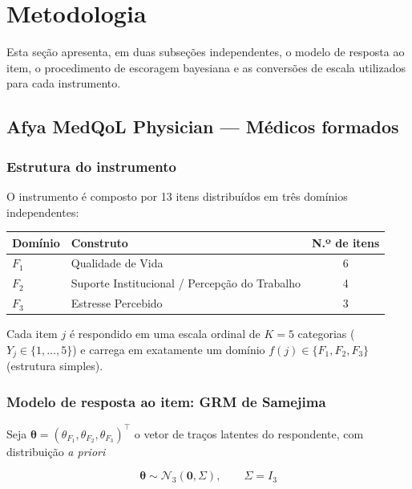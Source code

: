 \documentclass[12pt,a4paper]{article}
\begin{document}
\section{Metodologia}
\label{sec:metodologia}

Esta seção apresenta, em duas subseções independentes, o modelo de resposta
ao item, o procedimento de escoragem bayesiana e as conversões de escala
utilizados para cada instrumento.

\subsection{Afya MedQoL Physician --- Médicos formados}
\label{sec:medqol}

\subsubsection{Estrutura do instrumento}

O instrumento é composto por 13 itens distribuídos em três domínios
independentes:

\begin{table}[h]
\centering
\begin{tabular}{@{}llc@{}}
\toprule
Domínio & Construto & N.º de itens \\
\midrule
$F_1$ & Qualidade de Vida & 6 \\
$F_2$ & Suporte Institucional / Percepção do Trabalho & 4 \\
$F_3$ & Estresse Percebido & 3 \\
\bottomrule
\end{tabular}
\end{table}

Cada item $j$ é respondido em uma escala ordinal de $K=5$ categorias
($Y_j \in \{1,\dots,5\}$) e carrega em exatamente um domínio $f(j) \in
\{F_1,F_2,F_3\}$ (estrutura simples).

\subsubsection{Modelo de resposta ao item: GRM de Samejima}

Seja $\boldsymbol{\theta} = (\theta_{F_1}, \theta_{F_2}, \theta_{F_3})^\top$ o
vetor de traços latentes do respondente, com distribuição \emph{a priori}

\begin{equation}
\boldsymbol{\theta} \sim \mathcal{N}_3(\mathbf{0}, \Sigma), \qquad
\Sigma = I_3
\label{eq:medqol-prior}
\end{equation}
\end{document}
